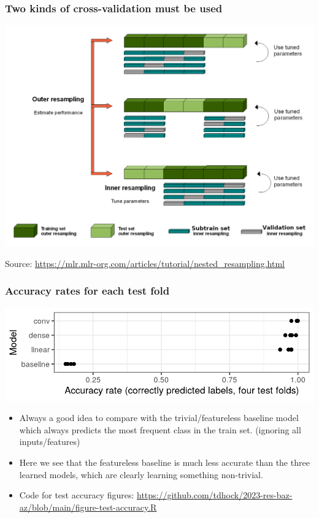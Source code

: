 \documentclass{beamer}
\begin{document}
 

\begin{frame}
  \frametitle{Two kinds of cross-validation must be used}
  
  \includegraphics[width=\textwidth]{nested_resampling.png}

  Source: \url{https://mlr.mlr-org.com/articles/tutorial/nested_resampling.html}
\end{frame}


\begin{frame}
  \frametitle{Accuracy rates for each test fold}
  \includegraphics[width=\textwidth]{figure-test-accuracy-baseline}

  \begin{itemize}
  \item Always a good idea to compare with the trivial/featureless baseline model which always
    predicts the most frequent class in the train set. (ignoring all
    inputs/features) 
  \item Here we see that the featureless baseline is much less accurate than the
    three learned models, which are clearly learning something non-trivial.
  \item Code for test accuracy figures:
    \url{https://github.com/tdhock/2023-res-baz-az/blob/main/figure-test-accuracy.R}
  \end{itemize}
\end{frame}
 
\end{document}
